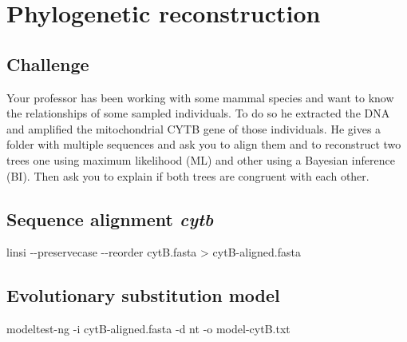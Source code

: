 \documentclass[
  letterpaper,
]{scrbook}
\newenvironment{Shaded}{\begin{snugshade}}{\end{snugshade}}
\newcommand{\AttributeTok}[1]{\textcolor[rgb]{0.40,0.46,0.14}{#1}}
\newcommand{\ExtensionTok}[1]{\textcolor[rgb]{0.00,0.46,0.62}{#1}}
\newcommand{\NormalTok}[1]{\textcolor[rgb]{0.00,0.46,0.62}{#1}}
\newcommand{\OperatorTok}[1]{\textcolor[rgb]{0.37,0.37,0.37}{#1}}
\begin{document}
\hypertarget{phylogenetic-reconstruction}{%
\chapter{Phylogenetic
reconstruction}\label{phylogenetic-reconstruction}}

\hypertarget{challenge-3}{%
\section*{Challenge}\label{challenge-3}}

Your professor has been working with some mammal species and want to
know the relationships of some sampled individuals. To do so he
extracted the DNA and amplified the mitochondrial CYTB gene of those
individuals. He gives a folder with multiple sequences and ask you to
align them and to reconstruct two trees one using maximum likelihood
(ML) and other using a Bayesian inference (BI). Then ask you to explain
if both trees are congruent with each other.

\hypertarget{sequence-alignment-cytb}{%
\section*{\texorpdfstring{Sequence alignment
\emph{cytb}}{Sequence alignment cytb}}\label{sequence-alignment-cytb}}

\begin{Shaded}
\begin{Highlighting}[]
\ExtensionTok{linsi} \AttributeTok{{-}{-}preservecase} \AttributeTok{{-}{-}reorder}\NormalTok{ cytB.fasta }\OperatorTok{\textgreater{}}\NormalTok{ cytB{-}aligned.fasta}
\end{Highlighting}
\end{Shaded}

\hypertarget{evolutionary-substitution-model-1}{%
\section*{Evolutionary substitution
model}\label{evolutionary-substitution-model-1}}

\begin{Shaded}
\begin{Highlighting}[]
\ExtensionTok{modeltest{-}ng} \AttributeTok{{-}i}\NormalTok{ cytB{-}aligned.fasta }\AttributeTok{{-}d}\NormalTok{ nt }\AttributeTok{{-}o}\NormalTok{ model{-}cytB.txt}
\end{Highlighting}
\end{Shaded}
\end{document}
